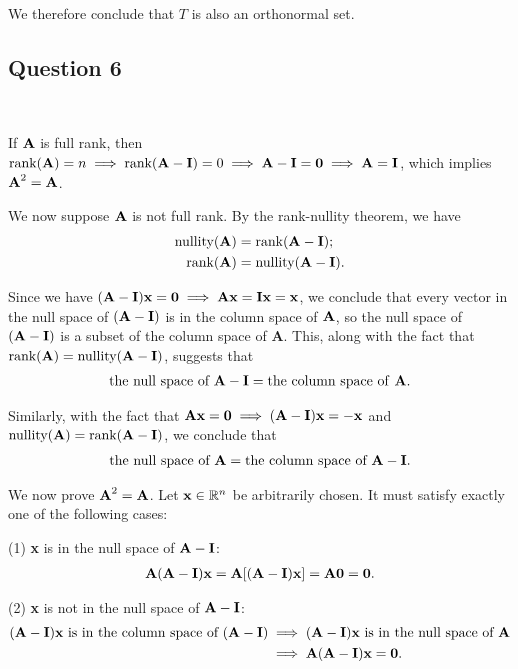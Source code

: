 \documentclass[12pt]{amsart}
\theoremstyle{plain}
\theoremstyle{definition}
\def\mb{\mathbb}
\def\bf{\textbf}
\newcommand{\tu}{\textup}
\newcommand{\RA}{\implies}
\newcommand{\rank}{\textup{rank}}
\newcommand{\nullity}{\textup{nullity}}
\begin{document}
We therefore conclude that $T$ is also an orthonormal set.

\newpage
\subsection*{Question 6}\ 

If $\bf A$ is full rank, then $\rank(\bf A)=n\RA \rank(\bf A-\bf I)=0\RA\bf A-\bf I=\bf 0\RA \bf A=\bf I$, which implies $\bf A^2=\bf A$.

We now suppose $\bf A$ is not full rank. By the rank-nullity theorem, we have
\begin{align*}
	\nullity (\bf A)&=\rank(\bf A-\bf I);\\
	\rank (\bf A)&=\nullity (\bf A-\bf I).
\end{align*}

Since we have $(\bf A-\bf I)\bf x=\bf 0\RA \bf A\bf x=\bf I\bf x=\bf x$, we conclude that every vector in the null space of $(\bf A-\bf I)$ is in the column space of $\bf A$, so the null space of $(\bf A-\bf I)$ is a subset of the column space of \bf A. This, along with the fact that $\rank (\bf A)=\nullity (\bf A-\bf I)$, suggests that 
\begin{align*}
	\tu{the null space of $\bf A-\bf I$}=\tu{the column space of \bf A}. 
\end{align*}

Similarly, with the fact that  $\bf A\bf x=\bf 0\RA (\bf A-\bf I)\bf x=-\bf x$ and $\nullity (\bf A)=\rank(\bf A-\bf I)$, we conclude that
\begin{align*}
	\tu{the null space of $\bf A$}=\tu{the column space of $\bf A-\bf I$}. 
\end{align*}

We now prove $\bf A^2=\bf A$. Let $\bf x\in\mb R^n$ be arbitrarily chosen. It must satisfy exactly one of the following cases:

\noindent (1) \bf x is in the null space of $\bf A-\bf I$:
\begin{align*}
	\bf A(\bf A-\bf I)\bf x=\bf A[(\bf A-\bf I)\bf x]=\bf A\bf 0=\bf 0.
\end{align*}

\noindent (2) \bf x is not in the null space of $\bf A-\bf I$:
\begin{align*}
	(\bf A-\bf I)\bf x \tu{ is in the column space of $(\bf A-\bf I)$}
	&\RA (\bf A-\bf I)\bf x \tu{ is in the null space of $\bf A$}\\
	&\RA\bf A(\bf A-\bf I)\bf x=\bf0.
\end{align*}
\end{document}
